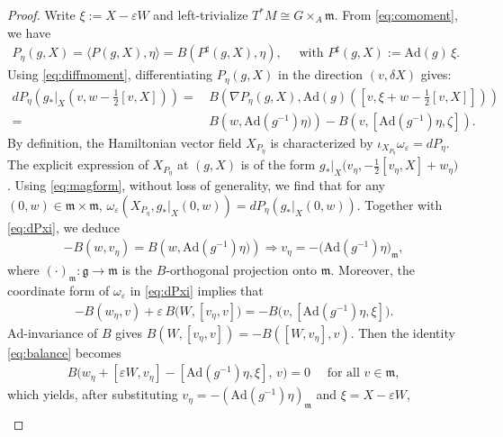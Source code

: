 \documentclass[11pt]{amsart}
\theoremstyle{definition}
\theoremstyle{plain}
\theoremstyle{conclusion}
\begin{document}
\begin{proof}
Write $\xi:=X-\varepsilon W$ and left-trivialize $T^*M\cong  G\times_A\mathfrak{m}$.  From \eqref{eq:comoment}, we have\begin{align*}
    P_\eta(g,X)=\langle P(g,X),\eta\rangle=B(P^\sharp(g,X),\eta),\quad \text{ with }
P^\sharp(g,X):=\mathrm{Ad}(g)\,\xi .
\end{align*}   Using \eqref{eq:diffmoment}, differentiating $P_\eta(g,X)$ in the direction $(v,\delta X)$ gives: \begin{align}
dP_\eta \left(g_*\vert_X\left(v,w-\frac{1}{2}[v,X] \right)\right) = & \, B\left(\nabla P_\eta(g,X),\mathrm{Ad}(g)\left(\left[v,\xi + w - \frac{1}{2}[v,X] \right]\right)\right) \label{eq:dPxi}\\
\nonumber
= & \, B\left(w, \mathrm{Ad}(g^{-1})\eta)\right) - B\left(v,[\mathrm{Ad}(g^{-1})\eta,\zeta]\right).
\end{align} By definition, the Hamiltonian vector field $X_{P_\eta}$ is characterized by $\iota_{X_{P_\eta}}\omega_\varepsilon=dP_\eta$.  The explicit expression of  $X_{P_\eta}$ at $(g,X)$ is of the form $g_*\vert_X\bigl(v_\eta,-\frac{1}{2}[v_\eta,X]+w_\eta\bigr)$.  Using \eqref{eq:magform}, without loss of generality, we find that for any $(0,w)\in\mathfrak{m}\times\mathfrak{m}$, $\omega_\varepsilon(X_{P_\eta},g_*\vert_X(0,w)) = dP_\eta (g_*\vert_X(0,w))$. Together with \eqref{eq:dPxi}, we deduce \begin{align*}
 -B(w,v_\eta)=B\left(w, \mathrm{Ad}(g^{-1})\eta)\right)\Longrightarrow v_\eta= -\bigl(\mathrm{Ad}(g^{-1})\eta\bigr)_{\mathfrak{m}},
\end{align*} where $(\cdot)_\mathfrak{m}: \mathfrak{g} \to \mathfrak{m}$ is the $B$-orthogonal projection onto $\mathfrak{m}$. Moreover, the coordinate form of $\omega_\varepsilon$ in \eqref{eq:dPxi} implies that \begin{align}
-B(w_\eta,v)+\varepsilon\,B \big(W,[v_\eta,v]\big)=-B \big(v,[\mathrm{Ad}(g^{-1})\eta,\xi]\big) . \label{eq:balance}
\end{align}  $\mathrm{Ad}$-invariance of $B$ gives $B(W,[v_\eta,v])=-B([W,v_\eta],v)$. Then the identity \eqref{eq:balance} becomes \begin{align*} 
B \big(w_\eta+[\varepsilon W,v_\eta]-[\mathrm{Ad}(g^{-1})\eta,\xi],\,v\big)=0\quad \text{ for all } v\in\mathfrak{m},
\end{align*}which yields, after substituting $v_\eta=-(\mathrm{Ad}(g^{-1})\eta)_{\mathfrak{m}}$ and $\xi=X-\varepsilon W$, \begin{align*}

\end{align*}
\end{proof}
\end{document}
